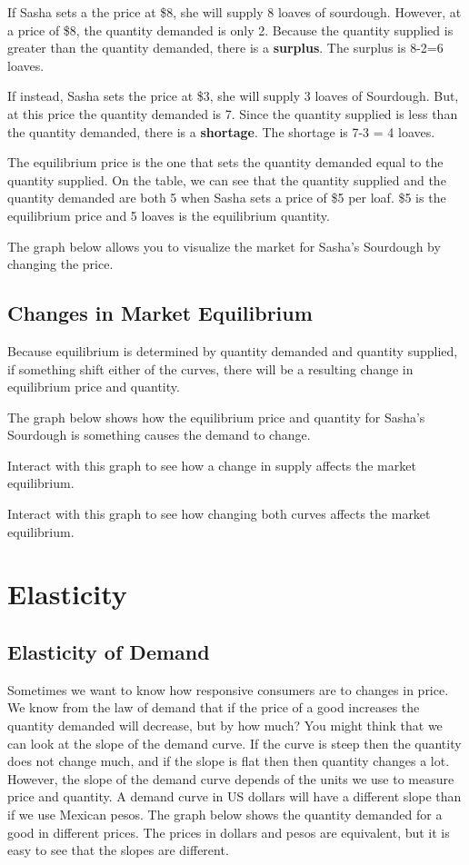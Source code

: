 \documentclass[
]{book}
\begin{document}
If Sasha sets a the price at \$8, she will supply 8 loaves of sourdough. However, at a price of \$8, the quantity demanded is only 2. Because the quantity supplied is greater than the quantity demanded, there is a \textbf{surplus}. The surplus is 8-2=6 loaves.

If instead, Sasha sets the price at \$3, she will supply 3 loaves of Sourdough. But, at this price the quantity demanded is 7. Since the quantity supplied is less than the quantity demanded, there is a \textbf{shortage}. The shortage is 7-3 = 4 loaves.

The equilibrium price is the one that sets the quantity demanded equal to the quantity supplied. On the table, we can see that the quantity supplied and the quantity demanded are both 5 when Sasha sets a price of \$5 per loaf. \$5 is the equilibrium price and 5 loaves is the equilibrium quantity.

The graph below allows you to visualize the market for Sasha's Sourdough by changing the price.

\section{Changes in Market Equilibrium}\label{changes-in-market-equilibrium}

Because equilibrium is determined by quantity demanded and quantity supplied, if something shift either of the curves, there will be a resulting change in equilibrium price and quantity.

The graph below shows how the equilibrium price and quantity for Sasha's Sourdough is something causes the demand to change.

Interact with this graph to see how a change in supply affects the market equilibrium.

Interact with this graph to see how changing both curves affects the market equilibrium.

\chapter{Elasticity}\label{elasticity}

\section{Elasticity of Demand}\label{elasticity-of-demand}

Sometimes we want to know how responsive consumers are to changes in price. We know from the law of demand that if the price of a good increases the quantity demanded will decrease, but by how much? You might think that we can look at the slope of the demand curve. If the curve is steep then the quantity does not change much, and if the slope is flat then then quantity changes a lot. However, the slope of the demand curve depends of the units we use to measure price and quantity. A demand curve in US dollars will have a different slope than if we use Mexican pesos. The graph below shows the quantity demanded for a good in different prices. The prices in dollars and pesos are equivalent, but it is easy to see that the slopes are different.
\end{document}

